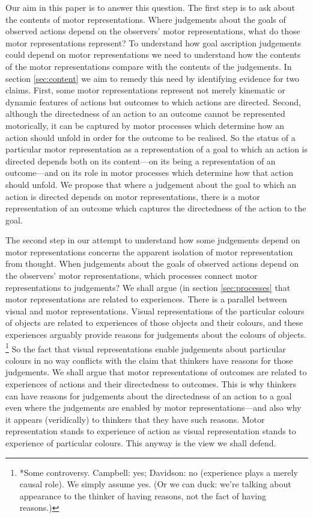 \documentclass[12pt,\papersize]{extarticle}
\begin{document}
Our aim in this paper is to answer this question. 
The first step is to ask about the contents of motor representations.
Where judgements about the goals of observed actions depend on the observers' motor representations, what do those motor representations represent?
To understand how goal ascription judgements could depend on motor representations we need to understand how the contents of the motor representations compare with the contents of the judgements.
In section \vref{sec:content} we aim to remedy this need by identifying evidence for two claims. First, some motor representations represent not merely kinematic or dynamic features of actions but outcomes to which actions are directed. Second, although the directedness of an action to an outcome cannot be represented motorically, it can be captured by motor processes which determine how an action should unfold in order for the outcome to be realised. So the status of a particular motor representation as a representation of a goal to which an action is directed depends both on its content---on its being a representation of an outcome---and on its role in motor processes which determine how that action should unfold.
We propose that where a judgement about the goal to which an action is directed depends on motor representations, there is a motor representation of an outcome which captures the directedness of the action to the goal.

The second step in our attempt to understand how some judgements depend on motor representations concerns the apparent isolation of motor representation from thought. When judgements about the goals of observed actions depend on the observers' motor representations, which processes connect motor representations to judgements?
We shall argue (in section \vref{sec:processes} that motor representations are related to experiences.  There is a parallel between visual and motor representations. Visual representations of the particular colours of objects are related to experiences of those objects and their colours, and these experiences arguably provide reasons for judgements about the colours of objects.%
\footnote{
*Some controversy.  Campbell: yes; Davidson: no (experience plays a merely causal role).  We simply assume yes.  (Or we can duck: we're talking about appearance to the thinker of having reasons, not the fact of having reasons.)}
So the fact that visual representations enable judgements about particular colours in no way conflicts with the claim that thinkers have reasons for those judgements.  We shall argue that motor representations of outcomes are related to experiences of actions and their directedness to outcomes.  This is why thinkers can have reasons for judgements about the directedness of an action to a goal even where the judgements are enabled by motor representations---and also why it appears (veridically) to thinkers that they have such reasons.  Motor representation stands to experience of action as visual representation stands to experience of particular colours. This anyway is the view we shall defend.
\end{document}
